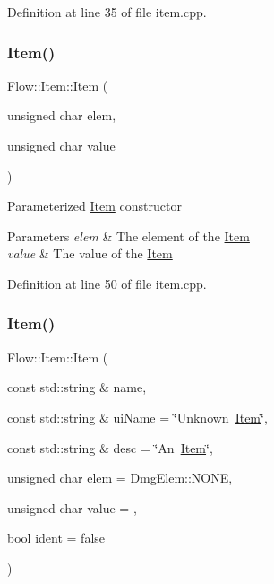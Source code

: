 Definition at line 35 of file item.\+cpp.

\hypertarget{class_flow_1_1_item_a7a4c9046f26096192a8df5cda0f1ce79}{}\label{class_flow_1_1_item_a7a4c9046f26096192a8df5cda0f1ce79} 
\subsubsection{\texorpdfstring{Item()}{Item()}\hspace{0.1cm}{\footnotesize\ttfamily [3/4]}}
{\footnotesize\ttfamily Flow\+::\+Item\+::\+Item (\begin{DoxyParamCaption}\item[{unsigned char}]{elem,  }\item[{unsigned char}]{value }\end{DoxyParamCaption})}

Parameterized \hyperlink{class_flow_1_1_item}{Item} constructor 
\begin{DoxyParams}{Parameters}
{\em elem} & The element of the \hyperlink{class_flow_1_1_item}{Item} \\
\hline
{\em value} & The value of the \hyperlink{class_flow_1_1_item}{Item} \\
\hline
\end{DoxyParams}


Definition at line 50 of file item.\+cpp.

\hypertarget{class_flow_1_1_item_a69ddfc7a600d8a66a4b6a045f149ce6a}{}\label{class_flow_1_1_item_a69ddfc7a600d8a66a4b6a045f149ce6a} 
\subsubsection{\texorpdfstring{Item()}{Item()}\hspace{0.1cm}{\footnotesize\ttfamily [4/4]}}
{\footnotesize\ttfamily Flow\+::\+Item\+::\+Item (\begin{DoxyParamCaption}\item[{const std\+::string \&}]{name,  }\item[{const std\+::string \&}]{ui\+Name = {\ttfamily \char`\"{}Unknown~\hyperlink{class_flow_1_1_item}{Item}\char`\"{}},  }\item[{const std\+::string \&}]{desc = {\ttfamily \char`\"{}An~\hyperlink{class_flow_1_1_item}{Item}\char`\"{}},  }\item[{unsigned char}]{elem = {\ttfamily \hyperlink{namespace_flow_1_1_dmg_elem_a2c7180f371963927ddcc5b333568a33b}{Dmg\+Elem\+::\+N\+O\+NE}},  }\item[{unsigned char}]{value = {},  }\item[{bool}]{ident = {\ttfamily false} }\end{DoxyParamCaption})}


